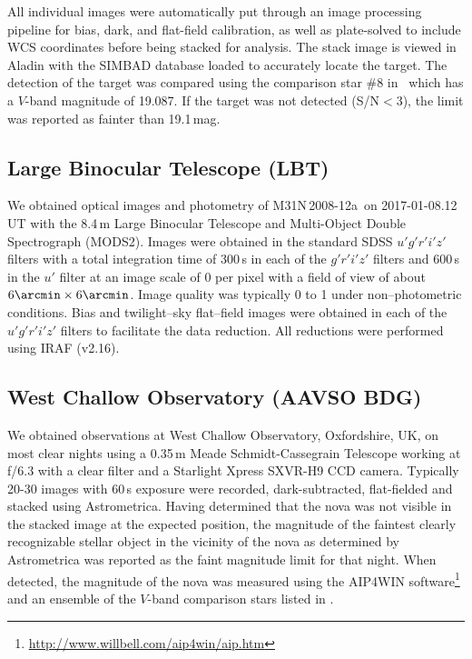 \documentclass[twocolumn,tighten]{aastex6}
\def\nova{{M31N\,2008-12a~}}
\newcommand{\othreek}{\citetalias{2016ApJ...833..149D}}
\begin{document}
All individual images were automatically put through an image processing pipeline for bias, dark, and flat-field calibration, as well as plate-solved to include WCS coordinates before being stacked for analysis. The stack image is viewed in Aladin \citep[v9;][]{2000A&AS..143...33B,2014ASPC..485..277B} with the SIMBAD database \citep{2000A&AS..143....9W} loaded to accurately locate the target. The detection of the target was compared using the comparison star \#8 in \othreek\ which has a $V$-band magnitude of 19.087. If the target was not detected (S/N$<3$), the limit was reported as fainter than 19.1\,mag.

\subsection{Large Binocular Telescope (LBT)}

We obtained optical images and photometry of \nova on 2017-01-08.12 UT with the 8.4\,m Large Binocular Telescope and Multi-Object Double Spectrograph (MODS2).  Images were obtained in the standard SDSS $u'g'r'i'z'$ filters with a total integration time of 300\,s in each of the $g'r'i'z'$ filters and 600\,s in the $u'$ filter at an image scale of 0 per pixel with a field of view of about $6\arcmin \times 6\arcmin$.  Image quality was typically 0 to 1 under non--photometric conditions.  Bias and twilight--sky flat--field images were obtained in each of the $u'g'r'i'z'$ filters to facilitate the data reduction.  All reductions were performed using IRAF (v2.16).

\subsection{West Challow Observatory (AAVSO BDG)}

We obtained observations at West Challow Observatory, Oxfordshire, UK, on most clear nights using a 0.35\,m Meade Schmidt-Cassegrain Telescope working at f/6.3 with a clear filter and a Starlight Xpress SXVR-H9 CCD camera. Typically 20-30 images with 60\,s exposure were recorded, dark-subtracted, flat-fielded and stacked using Astrometrica. Having determined that the nova was not visible in the stacked image at the expected position, the magnitude of the faintest clearly recognizable stellar object in the vicinity of the nova as determined by Astrometrica was reported as the faint magnitude limit for that night. When detected, the magnitude of the nova was measured using the AIP4WIN software\footnote{\url{http://www.willbell.com/aip4win/aip.htm}} and an ensemble of the $V$-band comparison stars listed in \othreek.
\end{document}
